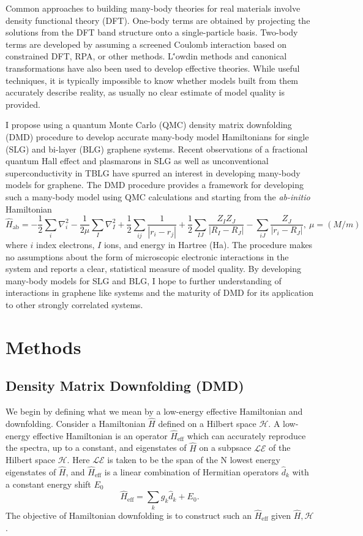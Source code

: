 \documentclass[12pt]{article}
\begin{document}
Common approaches to building many-body theories for real materials involve density functional theory (DFT).
One-body terms are obtained by projecting the solutions from the DFT band structure onto a single-particle basis.
Two-body terms are developed by assuming a screened Coulomb interaction based on constrained DFT, RPA, or other methods.
L\''{o}wdin methods and canonical transformations have also been used to develop effective theories.
While useful techniques, it is typically impossible to know whether models built from them accurately describe reality, as usually no clear estimate of model quality is provided.

I propose using a quantum Monte Carlo (QMC) density matrix downfolding (DMD) procedure to develop accurate many-body model Hamiltonians for single (SLG) and bi-layer (BLG) graphene systems.
Recent observations of a fractional quantum Hall effect and plasmarons in SLG as well as unconventional superconductivity in TBLG have spurred an interest in developing many-body models for graphene.
The DMD procedure provides a framework for developing such a many-body model using QMC calculations and starting from the \textit{ab-initio} Hamiltonian 
\begin{equation}
\hat{H}_\text{ab} = -\frac{1}{2} \sum_{i} \nabla_i^2 -\frac{1}{2\mu}\sum_{I} \nabla_I^2 + \frac{1}{2}\sum_{ij} \frac{1}{|r_i - r_j|} + \frac{1}{2}\sum_{IJ} \frac{Z_I Z_J}{|R_I - R_J|} - \sum_{iJ}\frac{Z_J}{|r_i - R_J|},\ \mu = (M/m)
\end{equation}
where $i$ index electrons, $I$ ions, and energy in Hartree (Ha).
The procedure makes no assumptions about the form of microscopic electronic interactions in the system and reports a clear, statistical measure of model quality.
By developing many-body models for SLG and BLG, I hope to further understanding of interactions in graphene like systems and the maturity of DMD for its application to other strongly correlated systems.

\section{Methods}
\subsection{Density Matrix Downfolding (DMD)}
We begin by defining what we mean by a low-energy effective Hamiltonian and downfolding.
Consider a Hamiltonian $\hat{H}$ defined on a Hilbert space $\mathcal{H}$.
A low-energy effective Hamiltonian is an operator $\hat{H}_\text{eff}$ which can accurately reproduce the spectra, up to a constant, and eigenstates of $\hat{H}$ on a subpsace $\mathcal{LE}$ of the Hilbert space $\mathcal{H}$.
Here $\mathcal{LE}$ is taken to be the span of the N lowest energy eigenstates of $\hat{H}$, and $\hat{H}_\text{eff}$ is a linear combination of Hermitian operators $\hat{d}_k$ with a constant energy shift $E_0$
\begin{equation}
\hat{H}_\text{eff} = \sum_{k} g_k \hat{d}_k  + E_0.
\label{eq:Heff}
\end{equation}
The objective of Hamiltonian downfolding is to construct such an $\hat{H}_\text{eff}$ given $\hat{H}, \mathcal{H}$.
\end{document}
